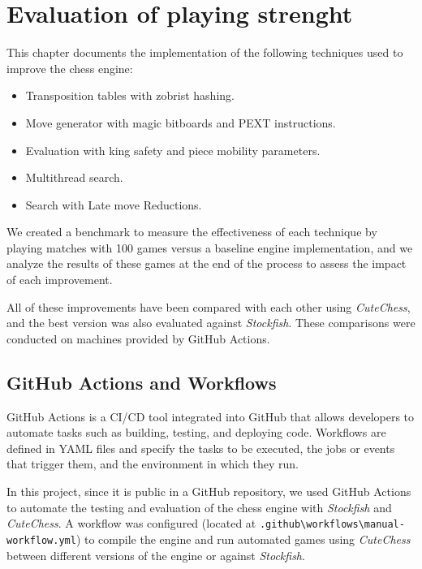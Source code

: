 \chapter{Evaluation of playing strenght}\label{cap:analysis}

This chapter documents the implementation of the following techniques used to improve the chess engine:

\begin{itemize}[itemsep=1pt]
    \item Transposition tables with zobrist hashing.
    \item Move generator with magic bitboards and PEXT instructions.
    \item Evaluation with king safety and piece mobility parameters.
    \item Multithread search.
    \item Search with Late move Reductions.
\end{itemize}


\vspace{1em}

\noindent We created a benchmark to measure the effectiveness of each technique by playing matches with 100 games versus a baseline engine implementation, and we analyze the results of these games at the end of the process to assess the impact of each improvement.


All of these improvements have been compared with each other using \textit{CuteChess}, and the best version was also evaluated against \textit{Stockfish}. These comparisons were conducted on machines provided by GitHub Actions.

\section{GitHub Actions and Workflows}

GitHub Actions is a CI/CD tool integrated into GitHub that allows developers to automate tasks such as building, testing, and deploying code. Workflows are defined in YAML files and specify the tasks to be executed, the jobs or events that trigger them, and the environment in which they run.

\vspace{1em}

\noindent In this project, since it is public in a GitHub repository, we used GitHub Actions to automate the testing and evaluation of the chess engine with \textit{Stockfish} and \textit{CuteChess}. A workflow was configured (located at \texttt{.github\textbackslash{}workflows\textbackslash{}manual-workflow.yml}) to compile the engine and run automated games using \textit{CuteChess} between different versions of the engine or against \textit{Stockfish}.

